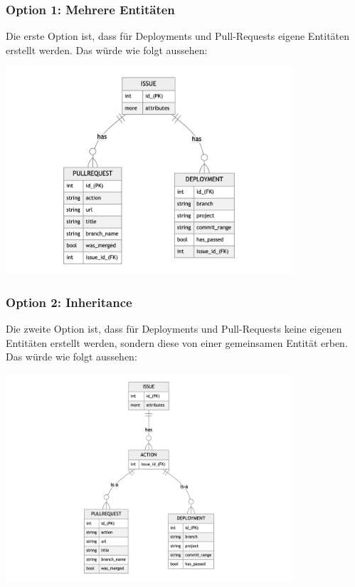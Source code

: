 \subsubsection{Option 1: Mehrere Entitäten}
Die erste Option ist, dass für Deployments und Pull-Requests eigene Entitäten erstellt werden. Das würde wie folgt aussehen:
\begin{center}
  \includegraphics[width=0.8\textwidth]{images/erd/multiple.png}
  \label{fig:erd_multiple}
\end{center}

\subsubsection{Option 2: Inheritance}
Die zweite Option ist, dass für Deployments und Pull-Requests keine eigenen Entitäten erstellt werden, sondern diese von
einer gemeinsamen Entität erben. Das würde wie folgt aussehen:
\begin{center}
  \includegraphics[width=0.8\textwidth]{images/erd/inheritance.png}
  \label{fig:erd_inheritance}
\end{center}

